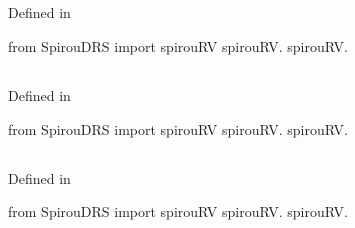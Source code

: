 \begin{minipage}{\textwidth}
\subsection{}

Defined in \spirouRV{}

\begin{pythonbox}
from SpirouDRS import spirouRV
spirouRV.
spirouRV.
\end{pythonbox}

\begin{pythondocstring}

\end{pythondocstring}
\end{minipage}

\begin{minipage}{\textwidth}
\subsection{}

Defined in \spirouRV{}

\begin{pythonbox}
from SpirouDRS import spirouRV
spirouRV.
spirouRV.
\end{pythonbox}

\begin{pythondocstring}

\end{pythondocstring}
\end{minipage}

\begin{minipage}{\textwidth}
\subsection{}

Defined in \spirouRV{}

\begin{pythonbox}
from SpirouDRS import spirouRV
spirouRV.
spirouRV.
\end{pythonbox}

\begin{pythondocstring}

\end{pythondocstring}
\end{minipage}

